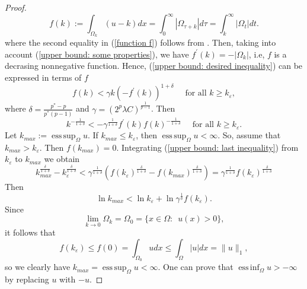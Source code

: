 \documentclass[a4paper,12pt,reqno]{amsart}
\renewcommand\eqref[1]{(\ref{#1})} %
\numberwithin{equation}{section}
\theoremstyle{plain}
\theoremstyle{definition}
\DeclareMathOperator*{\esssup}{ess\,sup}
\DeclareMathOperator*{\essinf}{ess\,inf}
\begin{document}
\begin{proof}
\begin{equation}
f(k):=\int_{\Omega_k}(u-k) d x=\int_{0}^{\infty}\left|\Omega_{\tau+k}\right|d\tau=\int_k^{\infty}\left|\Omega_{t}\right| d t.
\end{equation}
where the second equality in \eqref{function f} follows from \cite[Theorem 1.13]{Lieb2001}. Then, taking into account \eqref{upper bound: some properties}, we have $f^{\prime}(k)=-\left|\Omega_k\right|$, i.e, $f$ is a decrasing nonnegative function.   Hence, \eqref{upper bound: desired inequality} can be expressed in terms of $f$
\begin{equation*}
f(k) <\gamma k\left(-f^{\prime}(k)\right)^{1+\delta} \quad \text{ for all } k \geq k_{\varepsilon},
\end{equation*}
where $\delta=\frac{p^{*}-p}{p^{*}(p-1)}$ and $\gamma=(2^{p}\lambda C)^{\frac{1}{p-1}}$. Then
\begin{equation}\label{upper bound: last inequality}
 k^{-\frac{1}{1+\delta}} < -\gamma^{\frac{1}{1+\delta}}f^{\prime}(k) f(k)^{-\frac{1}{1+\delta}}  \quad \text{ for all } k \geq k_{\varepsilon}.
\end{equation}
Let $k_{max}:=\esssup_{\Omega}u$. If $k_{max}\leq k_{\varepsilon}$, then $\esssup_{\Omega}u<\infty$. So, assume that $k_{max}> k_{\varepsilon}$. Then $f(k_{max})=0$. Integrating \eqref{upper bound: last inequality} from $k_{\varepsilon}$ to $k_{max}$ we obtain
\begin{equation*}
k_{max}^{\frac{\delta}{1+\delta}}-k_{\varepsilon}^{\frac{\delta}{1+\delta}} < \gamma^{\frac{1}{1+\delta}}\left(f\left(k_{\varepsilon}\right)^{\frac{\delta}{1+\delta}}-f(k_{max})^{\frac{\delta}{1+\delta}}\right)= \gamma^{\frac{1}{1+\delta}}f\left(k_{\varepsilon}\right)^{\frac{\delta}{1+\delta}}
\end{equation*}
Then
\begin{equation*}
    \ln{k_{max}} <  \ln{k_{\varepsilon}}+\ln{\gamma^{\frac{1}{\delta}}f\left(k_{\varepsilon}\right)}.
\end{equation*}
Since
$$\lim_{k\to 0}\Omega_{k}=\Omega_{0}=\{x\in\Omega:\enspace u(x)>0\},$$
it follows that 
$$f\left(k_{\varepsilon}\right) \leq f(0)=\int_{\Omega_{0}}udx\leq \int_{\Omega}|u|dx= \|u\|_1,$$ 
so we clearly have $k_{max}=\esssup_{\Omega}u<\infty$. One can prove that $\essinf_{\Omega}u>-\infty$ by replacing $u$ with $-u$.
\end{proof}
\end{document}
